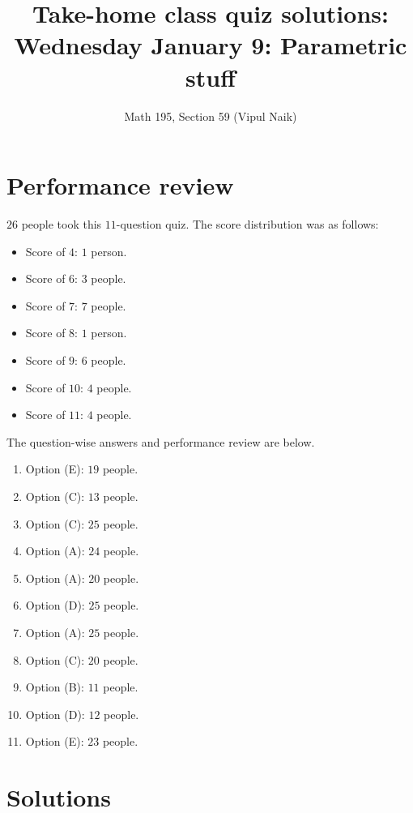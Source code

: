 \documentclass[10pt]{amsart}
\title{Take-home class quiz solutions: Wednesday January 9: Parametric stuff}
\author{Math 195, Section 59 (Vipul Naik)}
\begin{document}
\maketitle

\section{Performance review}

$26$ people took this $11$-question quiz. The score distribution was
as follows:

\begin{itemize}
\item Score of $4$: $1$ person.
\item Score of $6$: $3$ people.
\item Score of $7$: $7$ people.
\item Score of $8$: $1$ person.
\item Score of $9$: $6$ people.
\item Score of $10$: $4$ people.
\item Score of $11$: $4$ people.
\end{itemize}

The question-wise answers and performance review are below.

\begin{enumerate}
\item Option (E): $19$ people.
\item Option (C): $13$ people.
\item Option (C): $25$ people.
\item Option (A): $24$ people.
\item Option (A): $20$ people.
\item Option (D): $25$ people.
\item Option (A): $25$ people.
\item Option (C): $20$ people.
\item Option (B): $11$ people.
\item Option (D): $12$ people.
\item Option (E): $23$ people.
\end{enumerate}

\section{Solutions}
\end{document}
